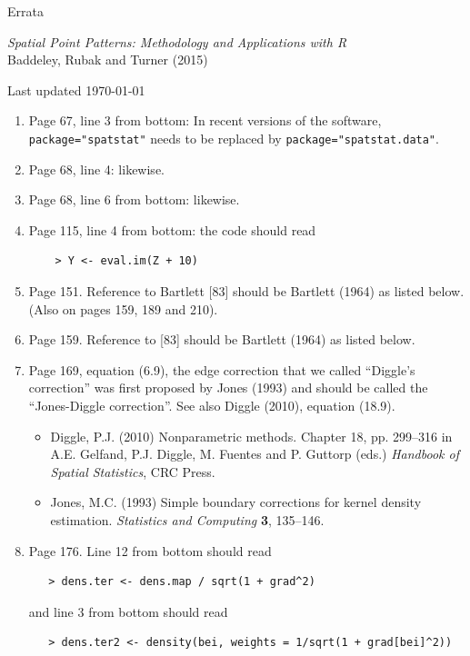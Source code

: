 \documentclass[12pt,a4paper]{article}
\begin{document}
\thispagestyle{empty}
\begin{center}
  \begin{LARGE}
    Errata 
  \end{LARGE}

  \begin{large}
    \emph{Spatial Point Patterns: Methodology and Applications with R}\\
    Baddeley, Rubak and Turner (2015)\\ 
  \end{large}
  Last updated \today
\end{center}

\begin{enumerate}
\item Page 67, line 3 from bottom: In recent versions of the software,
  \texttt{package="spatstat"} needs to be replaced by
  \texttt{package="spatstat.data"}.
\item Page 68, line 4: likewise.
\item Page 68, line 6 from bottom: likewise.
\item Page 115, line 4 from bottom: the code should read
\begin{verbatim}
    > Y <- eval.im(Z + 10)
\end{verbatim}
\item Page 151. Reference to Bartlett [83] should be Bartlett (1964)
  as listed below. (Also on pages 159, 189 and 210).
\item Page 159. Reference to [83] should be Bartlett (1964)
  as listed below.
\item Page 169, equation (6.9), the edge correction that we called
  ``Diggle's correction'' was first proposed by Jones (1993)
  and should be called the ``Jones-Diggle correction''.
  See also Diggle (2010), equation (18.9).
\begin{small}
  \begin{itemize}
  \item
    Diggle, P.J. (2010)
    Nonparametric methods.
    Chapter 18, pp. 299--316 in
    A.E. Gelfand, P.J. Diggle, M. Fuentes and P. Guttorp (eds.)
    \emph{Handbook of Spatial Statistics}, CRC Press.
  \item  Jones, M.C. (1993)
    Simple boundary corrections for kernel density estimation.
    \emph{Statistics and Computing} \textbf{3}, 135--146.
  \end{itemize}
\end{small}
\item Page 176. Line 12 from bottom should read
\begin{verbatim}
   > dens.ter <- dens.map / sqrt(1 + grad^2)
\end{verbatim}
  and line 3 from bottom should read
\begin{verbatim}
   > dens.ter2 <- density(bei, weights = 1/sqrt(1 + grad[bei]^2))
\end{verbatim}
  

\end{enumerate}
\end{document}
